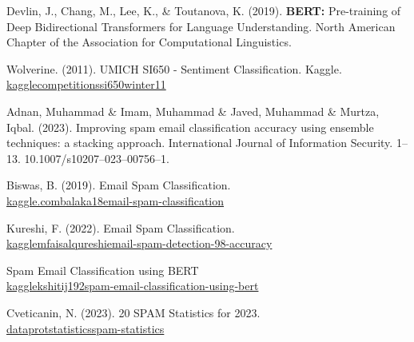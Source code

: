 \documentclass[conference]{IEEEtran}
\begin{document}
\begin{thebibliography}{00}
     Devlin, J., Chang, M., Lee, K., \& Toutanova, K. (2019). \textbf{BERT:} Pre-training of Deep Bidirectional Transformers for Language Understanding. North American Chapter of the Association for Computational Linguistics.
    
     Wolverine. (2011). UMICH SI650 - Sentiment Classification. Kaggle. \\\href{https://kaggle.com/competitions/si650winter11}{kaggle\textrightarrow competitions\textrightarrow si650winter11}
    
     Adnan, Muhammad \& Imam, Muhammad \& Javed, Muhammad \& Murtza, Iqbal. (2023). Improving spam email classification accuracy using ensemble techniques: a stacking approach. International Journal of Information Security. 1--13. 10.1007/s10207--023--00756--1. 
    
     Biswas, B. (2019). Email Spam Classification. \\\href{https://www.kaggle.com/code/balaka18/email-spam-classification}{kaggle.com\textrightarrow balaka18\textrightarrow email-spam-classification}
    
     Kureshi, F. (2022). Email Spam Classification. \\\href{https://www.kaggle.com/code/mfaisalqureshi/email-spam-detection-98-accuracy}{kaggle\textrightarrow mfaisalqureshi\textrightarrow email-spam-detection-98-accuracy}
    
     Spam Email Classification using BERT 
    \\\href{https://www.kaggle.com/code/kshitij192/spam-email-classification-using-bert}{kaggle\textrightarrow kshitij192\textrightarrow spam-email-classification-using-bert}
    
     Cveticanin, N. (2023). 20 SPAM Statistics for 2023. \\\href{https://dataprot.net/statistics/spam-statistics/}{dataprot\textrightarrow statistics\textrightarrow spam-statistics}
\end{thebibliography}
\end{document}
